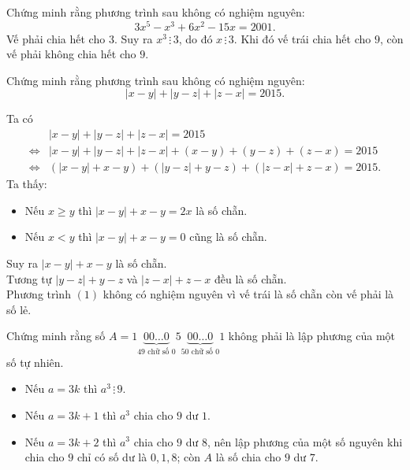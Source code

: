 \begin{bt}
	Chứng minh rằng phương trình sau không có nghiệm nguyên: $$3x^5-x^3+6x^2-15x=2001.$$
	\loigiai 
	{
		Vế phải chia hết cho $3$. Suy ra $x^3 \,\vdots \,3$, do đó $x \,\vdots\, 3$. Khi đó vế trái chia hết cho $9$, còn vế phải không chia hết cho $9$.
	}
\end{bt}

\begin{bt}
	Chứng minh rằng phương trình sau không có nghiệm nguyên: $$|x-y|+|y-z|+|z-x|=2015.$$
	\loigiai 
	{
		Ta có
		{\allowdisplaybreaks
		\begin{align*}
			& |x-y|+|y-z|+|z-x|=2015 \\
			\Leftrightarrow &|x-y|+|y-z|+|z-x|+(x-y)+(y-z)+(z-x)=2015 \\
			\Leftrightarrow &\left(|x-y|+x-y\right) + \left(|y-z|+y-z\right) + \left(|z-x|+z-x\right) = 2015.\tag{1}
		\end{align*}}Ta thấy:
		\begin{itemize}
			\item Nếu $x \ge y$ thì $|x-y|+x-y = 2x$ là số chẵn.
			\item Nếu $x<y$ thì $|x-y|+x-y=0$ cũng là số chẵn.
		\end{itemize}
		Suy ra $|x-y|+x-y$ là số chẵn. \\
		Tương tự $|y-z|+y-z$ và $|z-x|+z-x$ đều là số chẵn. \\
		Phương trình $(1)$ không có nghiệm nguyên vì vế trái là số chẵn còn vế phải là số lẻ.
	}
\end{bt}

\begin{bt}
	Chứng minh rằng số $A=1\underbrace{00\ldots 0}_{49 \text{ chữ số }0}5\underbrace{00\ldots 0}_{50 \text{ chữ số }0}1$ không phải là lập phương của một số tự nhiên.
	\loigiai
	{
		\begin{itemize}
			\item Nếu $a=3k$ thì $a^3 \, \vdots \,9$.
			\item Nếu $a=3k+1$ thì $a^3$ chia cho $9$ dư $1$.
			\item Nếu $a=3k+2$ thì $a^3$ chia cho $9$ dư $8$, nên lập phương của một số nguyên khi chia cho $9$ chỉ có số dư là $0,1,8$; còn $A$ là số chia cho $9$ dư $7$.
		\end{itemize}
	}
\end{bt}
